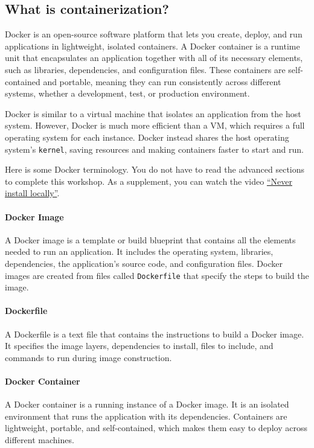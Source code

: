 \documentclass[french]{article}
\begin{document}
\subsection{What is containerization?}

Docker is an open-source software platform that lets you create, deploy, and run applications in lightweight, isolated containers.
A Docker container is a runtime unit that encapsulates an application together with all of its necessary elements, such as libraries, dependencies, and configuration files.
These containers are self-contained and portable, meaning they can run consistently across different systems, whether a development, test, or production environment.

Docker is similar to a virtual machine that isolates an application from the host system.
However, Docker is much more efficient than a VM, which requires a full operating system for each instance.
Docker instead shares the host operating system’s \texttt{kernel}, saving resources and making containers faster to start and run.

Here is some Docker terminology.
You do not have to read the advanced sections to complete this workshop.
As a supplement, you can watch the video \href{https://www.youtube.com/watch?v=J0NuOlA2xDc}{“Never install locally”}\cite{coderized2023docker}.

\paragraph{Docker Image}
A Docker image is a template or build blueprint that contains all the elements needed to run an application.
It includes the operating system, libraries, dependencies, the application’s source code, and configuration files.
Docker images are created from files called \texttt{Dockerfile} that specify the steps to build the image.

\paragraph{Dockerfile}
A Dockerfile is a text file that contains the instructions to build a Docker image.
It specifies the image layers, dependencies to install, files to include, and commands to run during image construction.

\paragraph{Docker Container}
A Docker container is a running instance of a Docker image.
It is an isolated environment that runs the application with its dependencies.
Containers are lightweight, portable, and self-contained, which makes them easy to deploy across different machines.
\end{document}
